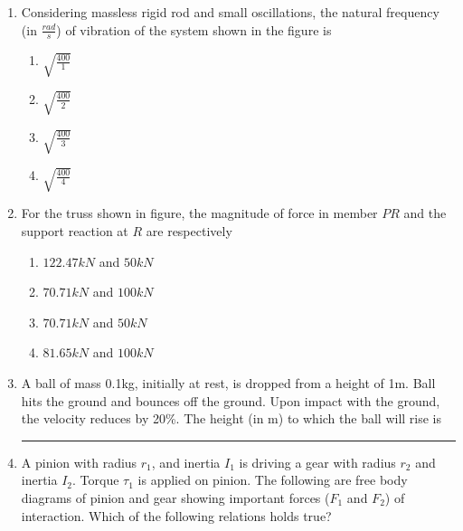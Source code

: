 \documentclass[journal]{IEEEtran}
\begin{document}
\begin{enumerate}
        
    \item Considering massless rigid rod and small oscillations, the natural frequency (in $\frac{rad}{s}$) of vibration of the system shown in the figure is

    

    \begin{multicols}{4}
        \begin{enumerate}
            \item $\sqrt{\frac{400}{1}}$
            \item $\sqrt{\frac{400}{2}}$
            \item $\sqrt{\frac{400}{3}}$
            \item $\sqrt{\frac{400}{4}}$
        \end{enumerate}
    \end{multicols}

    
    \item For the truss shown in figure, the magnitude of force in member $PR$ and the support reaction at $R$ are respectively
    
    


    \begin{multicols}{2}
        \begin{enumerate}
            \item $122.47kN$ and $50kN$
            \item $70.71kN$ and $100kN$
            \item $70.71kN$ and $50kN$
            \item $81.65kN$ and $100kN$
        \end{enumerate}
    \end{multicols}

    
    \item A ball of mass 0.1kg, initially at rest, is dropped from a height of 1m. Ball hits the ground and bounces off the ground. Upon impact with the ground, the velocity reduces by 20\%. The height (in m) to which the ball will rise is \rule{1cm}{0.15mm}

    
    \item A pinion with radius $r_1$, and inertia $I_1$ is driving a gear with radius $r_2$ and inertia $I_2$. Torque $\tau_1$ is applied on pinion. The following are free body diagrams of pinion and gear showing important forces ($F_1$ and $F_2$) of interaction. Which of the following relations holds true?


\end{enumerate}
\end{document}
